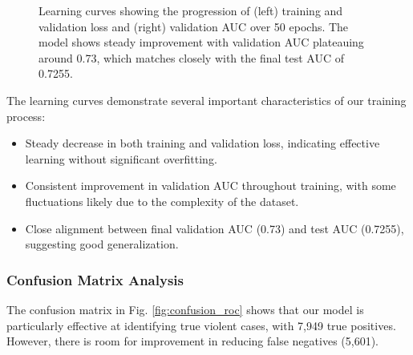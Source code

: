 \documentclass[conference]{IEEEtran}
\begin{document}
\begin{figure}[htbp]
    \caption{Learning curves showing the progression of (left) training and validation loss and (right) validation AUC over 50 epochs. The model shows steady improvement with validation AUC plateauing around 0.73, which matches closely with the final test AUC of 0.7255.}
    \label{fig:learning_curves}
\end{figure}

The learning curves demonstrate several important characteristics of our
training process:

\begin{itemize}
    \item Steady decrease in both training and validation loss, indicating effective
          learning without significant overfitting.
    \item Consistent improvement in validation AUC throughout training, with some
          fluctuations likely due to the complexity of the dataset.
    \item Close alignment between final validation AUC (0.73) and test AUC (0.7255),
          suggesting good generalization.
\end{itemize}

\subsubsection{Confusion Matrix Analysis}
The confusion matrix in Fig. \ref{fig:confusion_roc} shows that our model is
particularly effective at identifying true violent cases, with 7,949 true
positives. However, there is room for improvement in reducing false negatives
(5,601).
\end{document}
